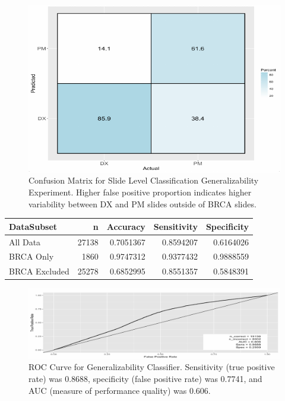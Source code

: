 \documentclass[12pt,]{article}
\begin{document}
\begin{figure}[H]

{\centering \includegraphics{figure/graphics-unnamed-chunk-11-1} 

}

\caption{Confusion Matrix for Slide Level Classification Generalizability Experiment. Higher false positive proportion indicates higher variability between DX and PM slides outside of BRCA slides.}\label{fig:unnamed-chunk-11}
\end{figure}

\begin{longtable}[c]{@{}lrrrr@{}}
\toprule
DataSubset & n & Accuracy & Sensitivity & Specificity\tabularnewline
\midrule
\endhead
All Data & 27138 & 0.7051367 & 0.8594207 & 0.6164026\tabularnewline
BRCA Only & 1860 & 0.9747312 & 0.9377432 & 0.9888559\tabularnewline
BRCA Excluded & 25278 & 0.6852995 & 0.8551357 & 0.5848391\tabularnewline
\bottomrule
\end{longtable}

\begin{figure}[H]

{\centering \includegraphics{figure/graphics-unnamed-chunk-13-1} 

}

\caption{ROC Curve for Generalizability Classifier. Sensitivity (true positive rate) was  0.8688, specificity (false positive rate) was 0.7741, and AUC (measure of performance quality) was 0.606.}\label{fig:unnamed-chunk-13}
\end{figure}
\end{document}
